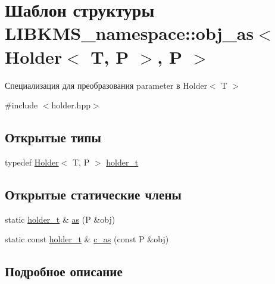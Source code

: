 \hypertarget{structLIBKMS__namespace_1_1obj__as_3_01Holder_3_01T_00_01P_01_4_00_01P_01_4}{\section{Шаблон структуры L\-I\-B\-K\-M\-S\-\_\-namespace\-:\-:obj\-\_\-as$<$ Holder$<$ T, P $>$, P $>$}
\label{structLIBKMS__namespace_1_1obj__as_3_01Holder_3_01T_00_01P_01_4_00_01P_01_4}
}


Специализация для преобразования parameter в Holder$<$ T $>$  




{\ttfamily \#include $<$holder.\-hpp$>$}

\subsection*{Открытые типы}
\begin{DoxyCompactItemize}
\item 
typedef \hyperlink{classLIBKMS__namespace_1_1Holder}{Holder}$<$ T, P $>$ \hyperlink{structLIBKMS__namespace_1_1obj__as_3_01Holder_3_01T_00_01P_01_4_00_01P_01_4_aa25f14fd65890cd92986509117d1dd7b}{holder\-\_\-t}
\end{DoxyCompactItemize}
\subsection*{Открытые статические члены}
\begin{DoxyCompactItemize}
\item 
static \hyperlink{structLIBKMS__namespace_1_1obj__as_3_01Holder_3_01T_00_01P_01_4_00_01P_01_4_aa25f14fd65890cd92986509117d1dd7b}{holder\-\_\-t} \& \hyperlink{structLIBKMS__namespace_1_1obj__as_3_01Holder_3_01T_00_01P_01_4_00_01P_01_4_a68c5ed911c1996920c3f40fb2cfe43d7}{as} (P \&obj)
\item 
static const \hyperlink{structLIBKMS__namespace_1_1obj__as_3_01Holder_3_01T_00_01P_01_4_00_01P_01_4_aa25f14fd65890cd92986509117d1dd7b}{holder\-\_\-t} \& \hyperlink{structLIBKMS__namespace_1_1obj__as_3_01Holder_3_01T_00_01P_01_4_00_01P_01_4_a05795aa17b8a30e1b7113fb7672cf278}{c\-\_\-as} (const P \&obj)
\end{DoxyCompactItemize}


\subsection{Подробное описание}
